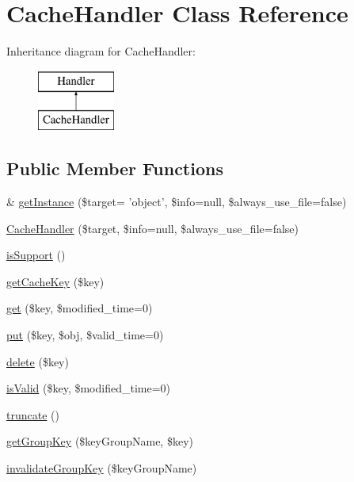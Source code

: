 \hypertarget{classCacheHandler}{\section{Cache\-Handler Class Reference}
\label{classCacheHandler}
}
Inheritance diagram for Cache\-Handler\-:\begin{figure}[H]
\begin{center}
\leavevmode
\includegraphics[height=2.000000cm]{classCacheHandler}
\end{center}
\end{figure}
\subsection*{Public Member Functions}
\begin{DoxyCompactItemize}
\item 
\& \hyperlink{classCacheHandler_a2fce85cb82ab180ce9d6bcea61a54eec}{get\-Instance} (\$target= 'object', \$info=null, \$always\-\_\-use\-\_\-file=false)
\item 
\hyperlink{classCacheHandler_a71cb13c8791b73a8153fd5bbc7aba3e3}{Cache\-Handler} (\$target, \$info=null, \$always\-\_\-use\-\_\-file=false)
\item 
\hyperlink{classCacheHandler_a4c137721670e0e9ce1d60bdd2f7235bb}{is\-Support} ()
\item 
\hyperlink{classCacheHandler_ab849392ce5ea0d57208f39d8a6a4fa43}{get\-Cache\-Key} (\$key)
\item 
\hyperlink{classCacheHandler_af726ae7803e5a73dee47bb43fc1fb8fc}{get} (\$key, \$modified\-\_\-time=0)
\item 
\hyperlink{classCacheHandler_af7fe9532fb10504cee980d7581a31995}{put} (\$key, \$obj, \$valid\-\_\-time=0)
\item 
\hyperlink{classCacheHandler_af51c1473c877ab5e20336d0d719c27d7}{delete} (\$key)
\item 
\hyperlink{classCacheHandler_a249fec6acdf496c8e7e3d5d9c24bc34a}{is\-Valid} (\$key, \$modified\-\_\-time=0)
\item 
\hyperlink{classCacheHandler_a10046e23ee8c8ef41bbbb69b2dda7889}{truncate} ()
\item 
\hyperlink{classCacheHandler_ab777b6b22477848324a25346da869596}{get\-Group\-Key} (\$key\-Group\-Name, \$key)
\item 
\hyperlink{classCacheHandler_a43118f91508ad5695a13f7a332cc9389}{invalidate\-Group\-Key} (\$key\-Group\-Name)
\end{DoxyCompactItemize}
